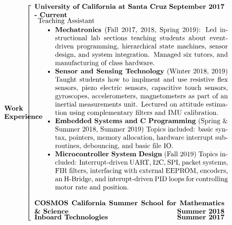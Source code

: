 \documentclass[paper=a4,fontsize=11pt]{article} %
\def \mainColWidth {0.8\textwidth}		%
\def \leftColWidth {0.05\textwidth}		%
\begin{document}
\begin{align*}
	&\\
	&
	\begin{array}{l} 
	\parbox{\leftColWidth}{%
		\textbf{Work \\ Experience}
	}%
	\end{array}
	&
	\left[\begin{array}{l}
		\parbox{\mainColWidth}{%
			\textbf{University of California at Santa Cruz} \hfill \textbf{September 2017 - Current}
		}%
		\\
		\begin{array}{l}
			\text{Teaching Assistant} \\
			\parbox{\mainColWidth}{%
				\begin{itemize}[noitemsep,topsep=0pt]
				\item \textbf{Mechatronics} (Fall 2017, 2018, Spring 2019): Led instructional lab sections teaching students about event-driven programming, hierarchical state machines, sensor design, and system integration. Managed six tutors, and manufacturing of class hardware.
				\item \textbf{Sensor and Sensing Technology} (Winter 2018, 2019) Taught students how to implment and use resistive flex sensors, piezo electric sensors, capacitive touch sensors, gyroscopes, accelerometers, magnetometers as part of an inertial measurements unit. Lectured on attitude estimation using complementary filters and IMU calibration.
				\item \textbf{Embedded Systems and C Programming} (Spring \& Summer 2018, Summer 2019) Topics included: basic syntax, pointers, memory allocation, hardware interrupt sub-routines, debouncing, and basic file IO.
				\item \textbf{Microcontroller System Design} (Fall 2019) Topics included: Interrupt-driven UART, I2C, SPI, packet systems, FIR filters, interfacing with external EEPROM, encoders, an H-Bridge, and interupt-driven PID loops for controlling motor rate and position. 
				\end{itemize}
			}%
		\end{array}\\
		\\
		\parbox{\mainColWidth}{%
			\textbf{COSMOS California Summer School for Mathematics \& Science}  \hfill \textbf{Summer 2018}
		}%
		\\
		\parbox{\mainColWidth}{%
			\textbf{Inboard Technologies} \hfill \textbf{Summer 2017}
		}%
	\end{array}\right. \\
\end{align*}
\end{document}
